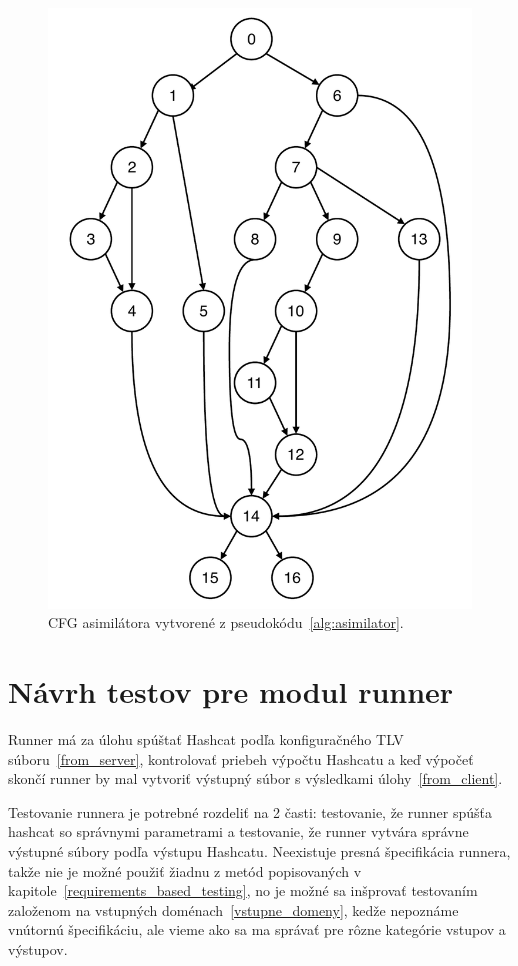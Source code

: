 \begin{figure}[h]
	\centering
	\includegraphics[height=0.7\paperheight]{obrazky/cfg_asimilator.pdf}
	\caption{CFG asimilátora vytvorené z pseudokódu~\ref{alg:asimilator}.}
	\label{fig:cfg_asim}
\end{figure}


\section{Návrh testov pre modul runner}
\label{navrh_runner}
Runner má za úlohu spúštať Hashcat podľa konfiguračného TLV súboru~\ref{from_server}, kontrolovať priebeh výpočtu Hashcatu a keď výpočeť skončí runner by mal vytvoriť výstupný súbor s výsledkami úlohy~\ref{from_client}.

Testovanie runnera je potrebné rozdeliť na 2 časti: testovanie, že runner spúšťa hashcat so správnymi parametrami a testovanie, že runner vytvára správne výstupné súbory podľa výstupu Hashcatu.
Neexistuje presná špecifikácia runnera, takže nie je možné použiť žiadnu z metód popisovaných v kapitole~\ref{requirements_based_testing}, no je možné sa inšprovať testovaním založenom na vstupných doménach~\ref{vstupne_domeny}, kedže nepoznáme vnútornú špecifikáciu, ale vieme ako sa ma správať pre rôzne kategórie vstupov a výstupov.

